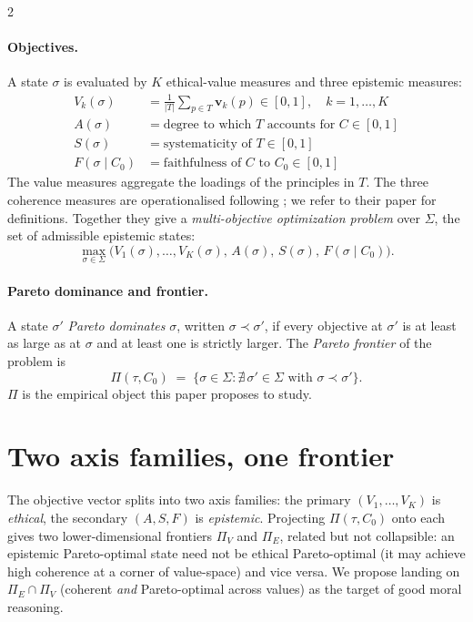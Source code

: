 \documentclass[10pt]{article}
\begin{document}
\begin{multicols}{2}
\paragraph{Objectives.} A state $\sigma$ is evaluated by $K$ ethical-value
measures and three epistemic measures:
\begin{align*}
  V_k(\sigma) &= \tfrac{1}{|T|} \textstyle\sum_{p \in T} \boldsymbol{v}_k(p)
    \in [0, 1], \quad k = 1, \dots, K \\
  A(\sigma) &= \text{degree to which } T \text{ accounts for } C \in [0, 1] \\
  S(\sigma) &= \text{systematicity of } T \in [0, 1] \\
  F(\sigma \mid C_0) &= \text{faithfulness of } C \text{ to } C_0 \in [0, 1]
\end{align*}
The value measures aggregate the loadings of the principles in $T$. The three
coherence measures are operationalised following \citet{beisbart2021}; we
refer to their paper for definitions. Together they give a
\emph{multi-objective optimization problem} over $\Sigma$, the set of
admissible epistemic states:
\[
  \max_{\sigma \in \Sigma} \bigl( V_1(\sigma), \dots, V_K(\sigma),\,
    A(\sigma),\, S(\sigma),\, F(\sigma \mid C_0) \bigr).
\]

\paragraph{Pareto dominance and frontier.} A state $\sigma'$ \emph{Pareto
dominates} $\sigma$, written $\sigma \prec \sigma'$, if every objective at
$\sigma'$ is at least as large as at $\sigma$ and at least one is strictly
larger. The \emph{Pareto frontier} of the problem is
\[
  \Pi(\tau, C_0) \;=\; \bigl\{ \sigma \in \Sigma : \nexists\, \sigma' \in \Sigma
    \text{ with } \sigma \prec \sigma' \bigr\}.
\]
$\Pi$ is the empirical object this paper proposes to study.

\section{Two axis families, one frontier}

The objective vector splits into two axis families: the primary
$(V_1, \dots, V_K)$ is \emph{ethical}, the secondary $(A, S, F)$ is
\emph{epistemic}. Projecting $\Pi(\tau, C_0)$ onto each gives two
lower-dimensional frontiers $\Pi_V$ and $\Pi_E$, related but not
collapsible: an epistemic Pareto-optimal state need not be ethical
Pareto-optimal (it may achieve high coherence at a corner of value-space)
and vice versa. We propose landing on $\Pi_E \cap \Pi_V$ (coherent \emph{and}
Pareto-optimal across values) as the target of good moral reasoning.


\end{multicols}
\end{document}
